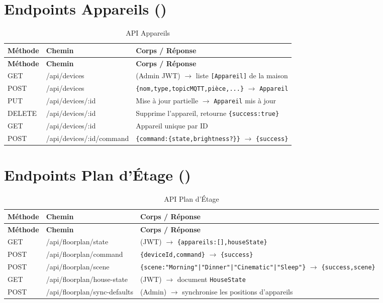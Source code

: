 \section{Endpoints Appareils ()}

\begin{longtable}{p{} p{} p{}}
\caption{API Appareils}\label{tab:api_devices}\\
\toprule
\textbf{Méthode} & \textbf{Chemin} & \textbf{Corps / Réponse} \\
\midrule
\endfirsthead
\toprule
\textbf{Méthode} & \textbf{Chemin} & \textbf{Corps / Réponse} \\
\midrule
\endhead
\bottomrule
\endfoot
GET    & /api/devices             & (Admin JWT) $\to$ liste \texttt{[Appareil]} de la maison \\
POST   & /api/devices             & \texttt{\{nom,type,topicMQTT,pièce,...\}} $\to$ \texttt{Appareil} \\
PUT    & /api/devices/:id         & Mise à jour partielle $\to$ \texttt{Appareil} mis à jour \\
DELETE & /api/devices/:id         & Supprime l'appareil, retourne \texttt{\{success:true\}} \\
GET    & /api/devices/:id         & Appareil unique par ID \\
POST   & /api/devices/:id/command & \texttt{\{command:\{state,brightness?\}\}} $\to$ \texttt{\{success\}} \\
\end{longtable}

\section{Endpoints Plan d'Étage ()}

\begin{longtable}{p{} p{} p{}}
\caption{API Plan d'Étage}\label{tab:api_floorplan}\\
\toprule
\textbf{Méthode} & \textbf{Chemin} & \textbf{Corps / Réponse} \\
\midrule
\endfirsthead
\toprule
\textbf{Méthode} & \textbf{Chemin} & \textbf{Corps / Réponse} \\
\midrule
\endhead
\bottomrule
\endfoot
GET  & /api/floorplan/state        & (JWT) $\to$ \texttt{\{appareils:[],houseState\}} \\
POST & /api/floorplan/command      & \texttt{\{deviceId,command\}} $\to$ \texttt{\{success\}} \\
POST & /api/floorplan/scene        & \texttt{\{scene:"Morning"|"Dinner"|"Cinematic"|"Sleep"\}} $\to$ \texttt{\{success,scene\}} \\
GET  & /api/floorplan/house-state  & (JWT) $\to$ document \texttt{HouseState} \\
POST & /api/floorplan/sync-defaults& (Admin) $\to$ synchronise les positions d'appareils \\
\end{longtable}


